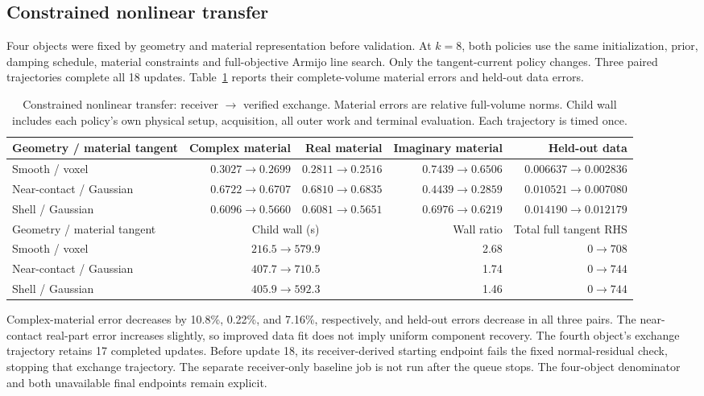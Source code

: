 \subsection{Constrained nonlinear transfer}
Four objects were fixed by geometry and material representation before validation. At $k=8$, both policies use the same initialization, prior, damping schedule, material constraints and full-objective Armijo line search. Only the tangent-current policy changes. Three paired trajectories complete all 18 updates. Table~\ref{tab:nonlinear} reports their complete-volume material errors and held-out data errors.

\begin{table}[t]\centering
\caption{Constrained nonlinear transfer: receiver $\rightarrow$ verified exchange. Material errors are relative full-volume norms. Child wall includes each policy's own physical setup, acquisition, all outer work and terminal evaluation. Each trajectory is timed once.}\label{tab:nonlinear}
\begin{tabular}{lrrrr}\toprule
Geometry / material tangent&Complex material&Real material&Imaginary material&Held-out data\\\midrule
Smooth / voxel&$0.3027\to0.2699$&$0.2811\to0.2516$&$0.7439\to0.6506$&$0.006637\to0.002836$\\
Near-contact / Gaussian&$0.6722\to0.6707$&$0.6810\to0.6835$&$0.4439\to0.2859$&$0.010521\to0.007080$\\
Shell / Gaussian&$0.6096\to0.5660$&$0.6081\to0.5651$&$0.6976\to0.6219$&$0.014190\to0.012179$\\\midrule
Geometry / material tangent&\multicolumn{2}{c}{Child wall (s)}&Wall ratio&Total full tangent RHS\\
Smooth / voxel&\multicolumn{2}{c}{$216.5\to579.9$}&2.68&$0\to708$\\
Near-contact / Gaussian&\multicolumn{2}{c}{$407.7\to710.5$}&1.74&$0\to744$\\
Shell / Gaussian&\multicolumn{2}{c}{$405.9\to592.3$}&1.46&$0\to744$\\\bottomrule
\end{tabular}
\end{table}

Complex-material error decreases by 10.8\%, 0.22\%, and 7.16\%, respectively, and held-out errors decrease in all three pairs. The near-contact real-part error increases slightly, so improved data fit does not imply uniform component recovery. The fourth object's exchange trajectory retains 17 completed updates. Before update 18, its receiver-derived starting endpoint fails the fixed normal-residual check, stopping that exchange trajectory. The separate receiver-only baseline job is not run after the queue stops. The four-object denominator and both unavailable final endpoints remain explicit.

